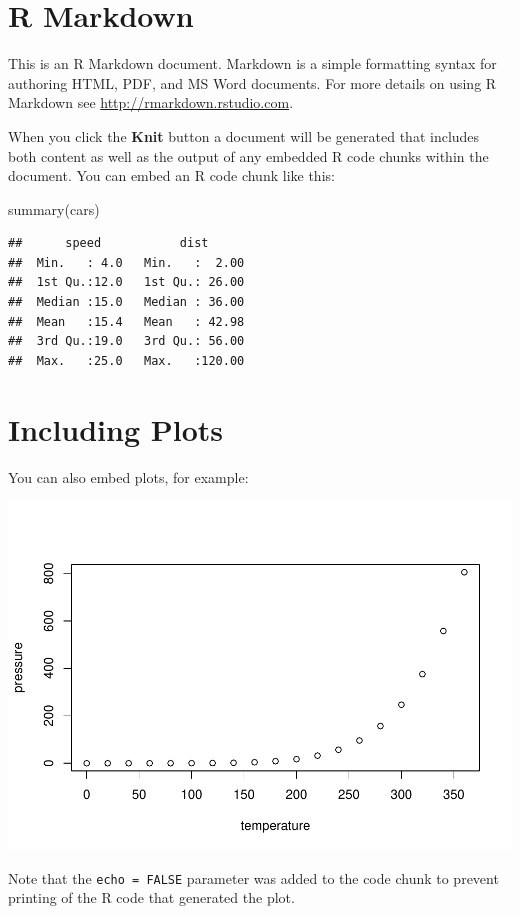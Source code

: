 \documentclass[
]{book}
\newenvironment{Shaded}{\begin{snugshade}}{\end{snugshade}}
\newcommand{\FunctionTok}[1]{\textcolor[rgb]{0.00,0.00,0.00}{#1}}
\newcommand{\NormalTok}[1]{#1}
\begin{document}
\hypertarget{r-markdown}{%
\section{R Markdown}\label{r-markdown}}

This is an R Markdown document. Markdown is a simple formatting syntax for authoring HTML, PDF, and MS Word documents. For more details on using R Markdown see \url{http://rmarkdown.rstudio.com}.

When you click the \textbf{Knit} button a document will be generated that includes both content as well as the output of any embedded R code chunks within the document. You can embed an R code chunk like this:

\begin{Shaded}
\begin{Highlighting}[]
\FunctionTok{summary}\NormalTok{(cars)}
\end{Highlighting}
\end{Shaded}

\begin{verbatim}
##      speed           dist       
##  Min.   : 4.0   Min.   :  2.00  
##  1st Qu.:12.0   1st Qu.: 26.00  
##  Median :15.0   Median : 36.00  
##  Mean   :15.4   Mean   : 42.98  
##  3rd Qu.:19.0   3rd Qu.: 56.00  
##  Max.   :25.0   Max.   :120.00
\end{verbatim}

\hypertarget{including-plots}{%
\section{Including Plots}\label{including-plots}}

You can also embed plots, for example:

\includegraphics{t_files/figure-latex/pressure-1.pdf}

Note that the \texttt{echo\ =\ FALSE} parameter was added to the code chunk to prevent printing of the R code that generated the plot.

  
\end{document}
